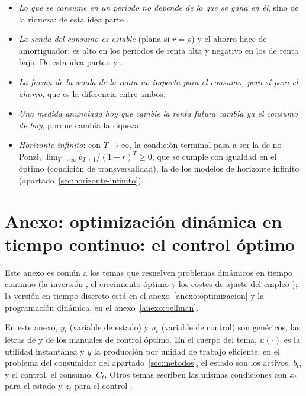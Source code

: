 \documentclass[11pt]{article}
\begin{document}
\begin{itemize}
\item \emph{Lo que se consume en un periodo no depende de lo que se gana en él}, sino de la riqueza: de esta idea parte .
\item \emph{La senda del consumo es estable} (plana si $r=\rho$) y el ahorro hace de amortiguador: es alto en los periodos de renta alta y negativo en los de renta baja. De esta idea parten  y .
\item \emph{La forma de la senda de la renta no importa para el consumo, pero sí para el ahorro}, que es la diferencia entre ambos.
\item \emph{Una medida anunciada hoy que cambie la renta futura cambia ya el consumo de hoy}, porque cambia la riqueza.
\item \emph{Horizonte infinito}: con $T\to\infty$, la condición terminal pasa a ser la de no-Ponzi, $\lim_{T\to\infty}b_{T+1}/(1+r)^T\geq 0$, que se cumple con igualdad en el óptimo (condición de transversalidad), la de los modelos de horizonte infinito (apartado~\ref{sec:horizonte-infinito}).
\end{itemize}

\section{Anexo: optimización dinámica en tiempo continuo:\cortetitulo{} el control óptimo}\label{anexo:control-optimo}

\begin{notaopositor}
Este anexo es común a los temas que resuelven problemas dinámicos en tiempo continuo (la inversión , el crecimiento óptimo  y los costes de ajuste del empleo ); la versión en tiempo discreto está en el anexo~\ref{anexo:optimizacion} y la programación dinámica, en el anexo~\ref{anexo:bellman}.
\end{notaopositor}

\begin{anotaciones}
En este anexo, $y_t$ (variable de estado) y $u_t$ (variable de control) son genéricos, las letras de \textcite{Cerda2001Optimizacion} y de los manuales de control óptimo. En el cuerpo del tema, $u(\cdot)$ es la utilidad instantánea y $y$ la producción por unidad de trabajo eficiente; en el problema del consumidor del apartado~\ref{sec:metodos}, el estado son los activos, $b_t$, y el control, el consumo, $C_t$. Otros temas escriben las mismas condiciones con $x_t$ para el estado y $z_t$ para el control .
\end{anotaciones}
\end{document}
